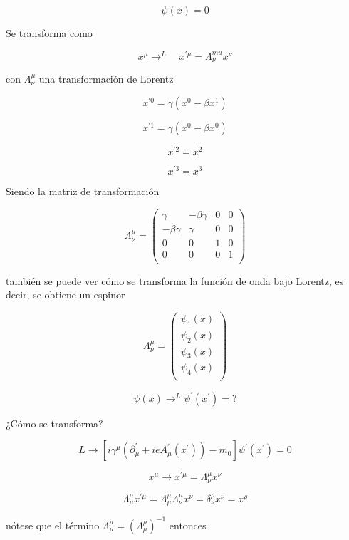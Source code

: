 \documentclass{report}
\begin{document}
\begin{equation}
[i \gamma^{\mu} (\partial_{\mu} + ieA_{\mu})-m_0] \psi (x) = 0
\end{equation}

Se transforma como 

\[x^{\mu} \rightarrow^{L} \quad x^{\prime \mu} = \Lambda^{mu}_{\nu} x^{\nu} \]

con $\Lambda_{\nu}^{\mu}$ una transformación de Lorentz

\[x^{\prime 0} = \gamma(x^{0}-\beta x^{1})\]

\[x^{\prime 1} = \gamma(x^{0}-\beta x^{0})\]

\[x^{\prime 2} = x^{2}\]

\[x^{\prime 3} = x^{3}\]

Siendo la matriz de transformación

\[\Lambda_{\nu}^{\mu} = \left ( \begin{array}{cccc}
 \gamma & -\beta \gamma & 0& 0 \\
 -\beta \gamma & \gamma & 0 &0 \\
0 & 0 & 1 &0 \\
0 & 0 & 0 &1 \\ \end{array} \right) 
\]

también se puede ver cómo se transforma la función de onda bajo Lorentz, es decir, se obtiene un espinor

\[\Lambda_{\nu}^{\mu} = \left ( \begin{array}{cccc}
 \psi_{1}(x)  \\
  \psi_{2}(x)  \\
 \psi_{3}(x)  \\
 \psi_{4}(x) \\ \end{array} \right) 
\]

\[\psi (x) \rightarrow^{L} \psi^{\prime}(x^{\prime}) = ? \]

¿Cómo se transforma?

\[L \rightarrow [i \gamma^{\mu} (\partial_{\mu}^{\prime} + ie A_{\mu}^{\prime} (x^{\prime}))-m_0] \psi^{\prime}(x^{\prime}) = 0\]

\[x^{\mu} \rightarrow x^{\prime \mu} = \Lambda_{\nu}^{\mu} x^{\nu}\]

\[\Lambda _{\mu}^{\rho} x^{\prime \mu} = \Lambda_{\mu}^{\rho} \Lambda_{\nu}^{\mu} x^{\nu} = \delta_{\nu}^{\rho} x^{\nu} = x^{\rho}\]

nótese que el término $\Lambda_{\mu}^{\rho} = (\Lambda_{\mu}^{\rho})^{-1}$ entonces 
\end{document}
